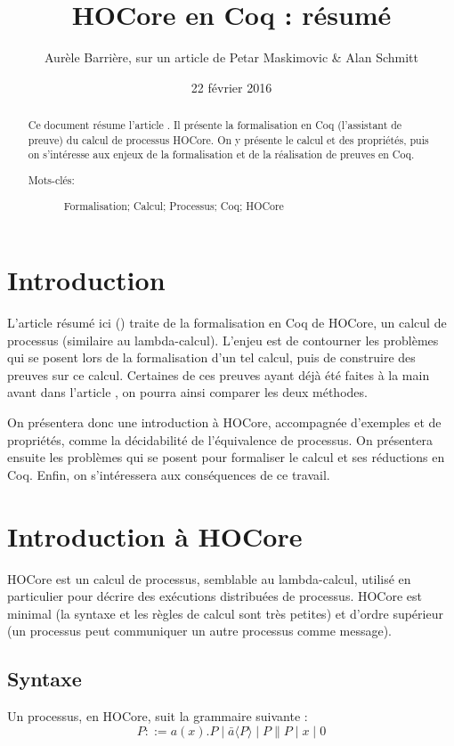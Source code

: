 \documentclass[11pt]{article}
\title{HOCore en Coq : résumé}
\date{22 février 2016}
\author{Aurèle Barrière, sur un article de Petar Maskimovic \& Alan Schmitt}
\begin{document}
\nocite{*}
\maketitle
\begin{abstract}
  Ce document résume l'article \cite{hocoreincoq}. Il présente la formalisation en Coq (l'assistant de preuve) du calcul de processus HOCore. On y présente le calcul et des propriétés, puis on s'intéresse aux enjeux de la formalisation et de la réalisation de preuves en Coq. 
  \begin{description}
  \item[Mots-clés:] Formalisation; Calcul; Processus; Coq; HOCore
  \end{description}
\end{abstract}

\section{Introduction}
L'article résumé ici (\cite{hocoreincoq}) traite de la formalisation en Coq de HOCore, un calcul de processus (similaire au lambda-calcul). L'enjeu est de contourner les problèmes qui se posent lors de la formalisation d'un tel calcul, puis de construire des preuves sur ce calcul. Certaines de ces preuves ayant déjà été faites à la main avant dans l'article \cite{expressiveness}, on pourra ainsi comparer les deux méthodes.

On présentera donc une introduction à HOCore, accompagnée d'exemples et de propriétés, comme la décidabilité de l'équivalence de processus.
On présentera ensuite les problèmes qui se posent pour formaliser le calcul et ses réductions en Coq.
Enfin, on s'intéressera aux conséquences de ce travail.

\section{Introduction à HOCore}
HOCore est un calcul de processus, semblable au lambda-calcul, utilisé en particulier pour décrire des exécutions distribuées de processus. HOCore est minimal (la syntaxe et les règles de calcul sont très petites) et d'ordre supérieur (un processus peut communiquer un autre processus comme message). 


\subsection{Syntaxe}
Un processus, en HOCore, suit la grammaire suivante :
$$ P ::= a(x).P \mid \bar{a}\langle P\rangle \mid P\|P \mid x \mid 0 $$
\end{document}
